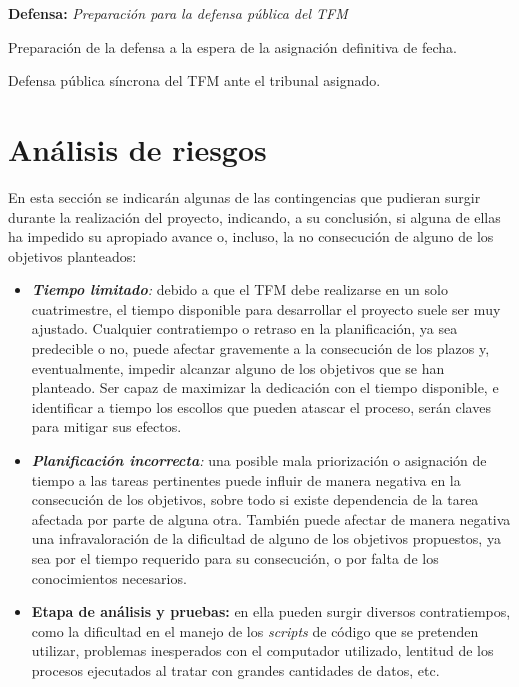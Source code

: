 \documentclass[IB,BIB]{TFUOC}%
\begin{document}
\begin{todolist}
  \item \textbf{Defensa:} \textit{Preparación para la defensa pública del TFM}
  \begin{todolist}
  \item Preparación de la defensa a la espera de la asignación definitiva de fecha.
  \item Defensa pública síncrona del TFM ante el tribunal asignado.
  \end{todolist}
\end{todolist}

\normalsize


\section{Análisis de riesgos}
\label{sec:PEC1 - Análisis de riesgos}

En esta sección se indicarán algunas de las contingencias que pudieran surgir durante la realización del proyecto, indicando, a su conclusión, si alguna de ellas ha impedido su apropiado avance o, incluso, la no consecución de alguno de los objetivos planteados:

\footnotesize

\begin{itemize}
\item \textit{\textbf{Tiempo limitado}:} debido a que el TFM debe realizarse en un solo cuatrimestre, el tiempo disponible para desarrollar el proyecto suele ser muy ajustado. Cualquier contratiempo o retraso en la planificación, ya sea predecible o no, puede afectar gravemente a la consecución de los plazos y, eventualmente, impedir alcanzar alguno de los objetivos que se han planteado. Ser capaz de maximizar la dedicación con el tiempo disponible, e identificar a tiempo los escollos que pueden atascar el proceso, serán claves para mitigar sus efectos.
\item \textit{\textbf{Planificación incorrecta}:} una posible mala priorización o asignación de tiempo a las tareas pertinentes puede influir de manera negativa en la consecución de los objetivos, sobre todo si existe dependencia de la tarea afectada por parte de alguna otra. También puede afectar de manera negativa una infravaloración de la dificultad de alguno de los objetivos propuestos, ya sea por el tiempo requerido para su consecución, o por falta de los conocimientos necesarios.
\item \textbf{Etapa de análisis y pruebas:} en ella pueden surgir diversos contratiempos, como la dificultad en el manejo de los \textit{scripts} de código que se pretenden utilizar, problemas inesperados con el computador utilizado, lentitud de los procesos ejecutados al tratar con grandes cantidades de datos, etc.
\end{itemize}
\end{document}

